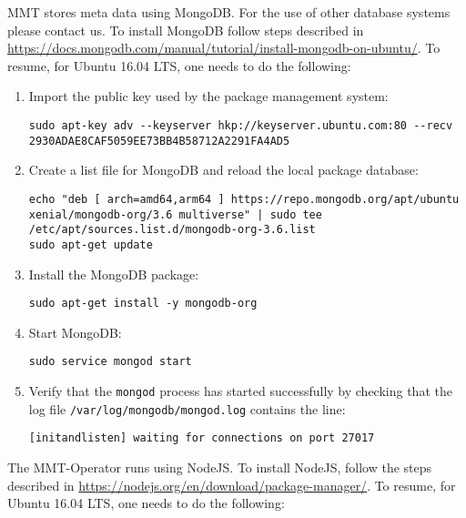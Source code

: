 MMT stores meta data using MongoDB. For the use of other database systems please contact us.
To install MongoDB follow steps described in \url{https://docs.mongodb.com/manual/tutorial/install-mongodb-on-ubuntu/}. 
To resume, for Ubuntu 16.04 LTS, one needs to do the following:

\begin{enumerate}
    \item Import the public key used by the package management system:
    
\begin{lstlisting}[style=BASH]
sudo apt-key adv --keyserver hkp://keyserver.ubuntu.com:80 --recv 2930ADAE8CAF5059EE73BB4B58712A2291FA4AD5
\end{lstlisting}

    \item Create a list file for MongoDB and reload the local package database:
    
\begin{lstlisting}[style=BASH]
echo "deb [ arch=amd64,arm64 ] https://repo.mongodb.org/apt/ubuntu xenial/mongodb-org/3.6 multiverse" | sudo tee /etc/apt/sources.list.d/mongodb-org-3.6.list
sudo apt-get update
\end{lstlisting}

    \item Install the MongoDB package:
    
\begin{lstlisting}[style=BASH]
sudo apt-get install -y mongodb-org
\end{lstlisting}

    \item Start MongoDB:
    
\begin{lstlisting}[style=BASH]
sudo service mongod start
\end{lstlisting}
    
    \item Verify that the \texttt{mongod} process has started successfully by checking that the log file \texttt{/var/log/mongodb/mongod.log} contains the line:
    
\begin{lstlisting}[style=BASH]
[initandlisten] waiting for connections on port 27017
\end{lstlisting}
    
    
\end{enumerate}

The MMT-Operator runs using NodeJS.
To install NodeJS, follow the steps described in \url{https://nodejs.org/en/download/package-manager/}.
To resume, for Ubuntu 16.04 LTS, one needs to do the following:

